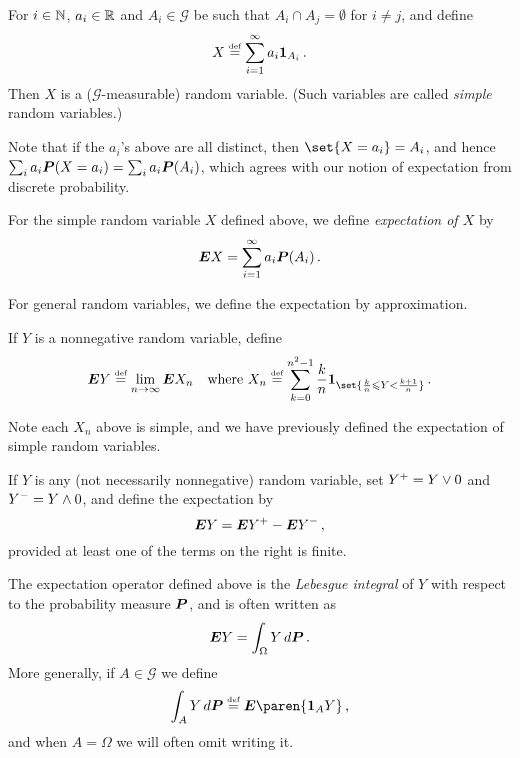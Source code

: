 \begin{example}
  For $i \in \N$,  $a_i \in \R$ and $A_i \in \mathcal G$ be such that $A_i \cap A_j = \emptyset$ for $i \neq j$, and define
  \begin{equation*}
    X\defeq \sum_{i=1}^\infty a_i \one_{A_i}\,.
  \end{equation*}
  Then $X$ is a ($\mathcal G$-measurable) random variable.
  (Such variables are called \emph{simple} random variables.)
\end{example}

Note that if the $a_i$'s above are all distinct, then $\set{X = a_i} = A_i$, and hence $\sum_i a_i \P(X = a_i) = \sum_i a_i \P(A_i)$, which agrees with our notion of expectation from discrete probability.

\begin{definition}
  For the simple random variable $X$ defined above, we define \emph{expectation of $X$} by
  \begin{equation*}
    \E X = \sum_{i = 1}^\infty a_i \P(A_i)\,.
  \end{equation*}
\end{definition}

For general random variables, we define the expectation by approximation.
\begin{definition}
  If $Y$ is a nonnegative random variable, define
  \begin{equation*}
    \E Y \defeq \lim_{n \to \infty} \E X_n
    \quad\text{where }
    X_n \defeq \sum_{k=0}^{n^2-1} \frac{k}{n} \one_{\set{\frac{k}{n} \leq Y < \frac{k+1}{n}}}\,.
  \end{equation*}
\end{definition}
\begin{remark}
  Note each $X_n$ above is simple, and we have previously defined the expectation of simple random variables.
\end{remark}
\begin{definition}
  If $Y$ is any (not necessarily nonnegative) random variable, set $Y^+ = Y \varmax 0$ and $Y^- = Y \varmin 0$, and define the expectation by
  \begin{equation*}
    \E Y = \E Y^+ - \E Y^-\,,
  \end{equation*}
  provided at least one of the terms on the right is finite.
\end{definition}
\begin{remark}
  The expectation operator defined above is the \emph{Lebesgue integral} of $Y$ with respect to the probability measure $\P$, and is often written as
  \begin{equation*}
    \E Y = \int_\Omega Y \, d\P\,.
  \end{equation*}
  More generally, if $A \in \mathcal G$ we define
  \begin{equation*}
    \int_A Y \, d\P \defeq \E \paren{ \one_{A} Y} \,,
  \end{equation*}
  and when $A = \Omega$ we will often omit writing it.
\end{remark}

